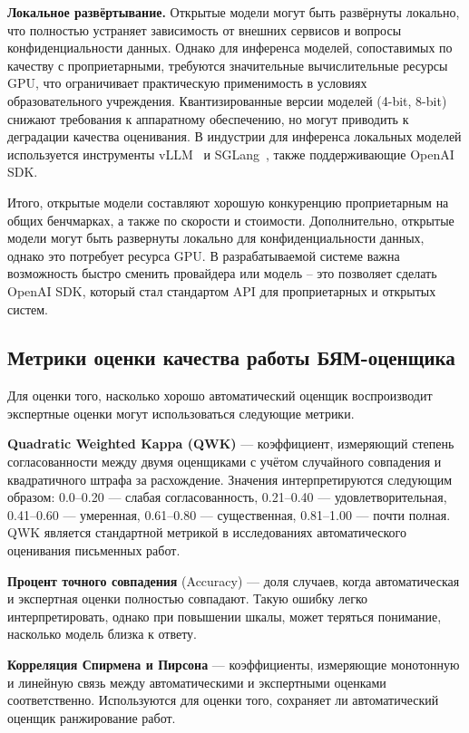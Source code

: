 \textbf{Локальное развёртывание.} Открытые модели могут быть развёрнуты локально, что полностью устраняет зависимость от внешних сервисов и вопросы конфиденциальности данных. Однако для инференса моделей, сопоставимых по качеству с проприетарными, требуются значительные вычислительные ресурсы GPU, что ограничивает практическую применимость в условиях образовательного учреждения. Квантизированные версии моделей (4-bit, 8-bit) снижают требования к аппаратному обеспечению, но могут приводить к деградации качества оценивания. В индустрии для инференса локальных моделей используется инструменты vLLM~\cite{kwon2023efficient} и SGLang~\cite{sglang}, также поддерживающие OpenAI SDK.


Итого, открытые модели составляют хорошую конкуренцию проприетарным на общих бенчмарках, а также по скорости и стоимости. Дополнительно, открытые модели могут быть развернуты локально для конфиденциальности данных, однако это потребует ресурса GPU. В разрабатываемой системе важна возможность быстро сменить провайдера или модель -- это позволяет сделать OpenAI SDK, который стал стандартом API для проприетарных и открытых систем.


\subsection{Метрики оценки качества работы БЯМ-оценщика}

Для оценки того, насколько хорошо автоматический оценщик воспроизводит экспертные оценки могут использоваться следующие метрики.

\textbf{Quadratic Weighted Kappa (QWK)} --- коэффициент, измеряющий степень согласованности между двумя оценщиками с учётом случайного совпадения и квадратичного штрафа за расхождение. Значения интерпретируются следующим образом: 0.0--0.20 --- слабая согласованность, 0.21--0.40 --- удовлетворительная, 0.41--0.60 --- умеренная, 0.61--0.80 --- существенная, 0.81--1.00 --- почти полная. QWK является стандартной метрикой в исследованиях автоматического оценивания письменных работ.

\textbf{Процент точного совпадения} (Accuracy) --- доля случаев, когда автоматическая и экспертная оценки полностью совпадают.
Такую ошибку легко интерпретировать, однако при повышении шкалы, может теряться понимание, насколько модель близка к ответу.

\textbf{Корреляция Спирмена и Пирсона} --- коэффициенты, измеряющие монотонную и линейную связь между автоматическими и экспертными оценками соответственно. Используются для оценки того, сохраняет ли автоматический оценщик ранжирование работ.

